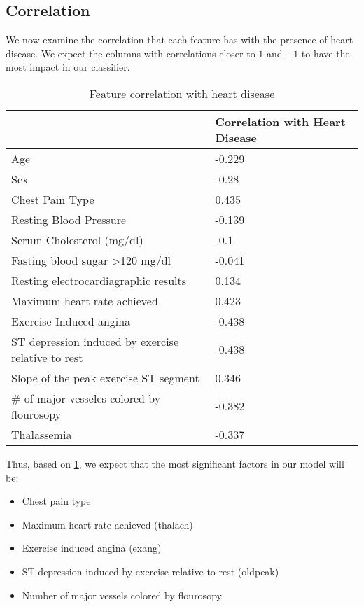 \documentclass[letter]{article}
\begin{document}
\subsection{Correlation}
We now examine the correlation that each feature has with the presence of heart disease.  We expect the columns with correlations closer to \(1\) and \(-1\) to have the most impact in our classifier.  
\begin{table}[]
	\centering
	\begin{tabular}{@{}|l|l|@{}}
		\toprule
		& Correlation with Heart Disease \\ \midrule
		Age                                                & -0.229                         \\
		Sex                                                & -0.28                          \\
		Chest Pain Type                                    & 0.435                          \\
		Resting Blood Pressure                             & -0.139                         \\
		Serum Cholesterol (mg/dl)                          & -0.1                           \\
		Fasting blood sugar \textgreater 120 mg/dl         & -0.041                         \\
		Resting electrocardiagraphic results               & 0.134                          \\
		Maximum heart rate achieved                        & 0.423                          \\
		Exercise Induced angina                            & -0.438                         \\
		ST depression induced by exercise relative to rest & -0.438                         \\
		Slope of the peak exercise ST segment              & 0.346                          \\
		\# of major vesseles colored by flourosopy         & -0.382                         \\
		Thalassemia                                        & -0.337                         \\ \bottomrule
	\end{tabular}
	\caption{Feature correlation with heart disease}
	\label{tab:correlation}
\end{table}
Thus, based on \ref{tab:correlation}, we expect that the most significant factors in our model will be:
\begin{itemize}
	\item Chest pain type
	\item Maximum heart rate achieved (thalach)
	\item Exercise induced angina (exang)
	\item ST depression induced by exercise relative to rest (oldpeak)
	\item Number of major vessels colored by flourosopy
\end{itemize}
\end{document}
